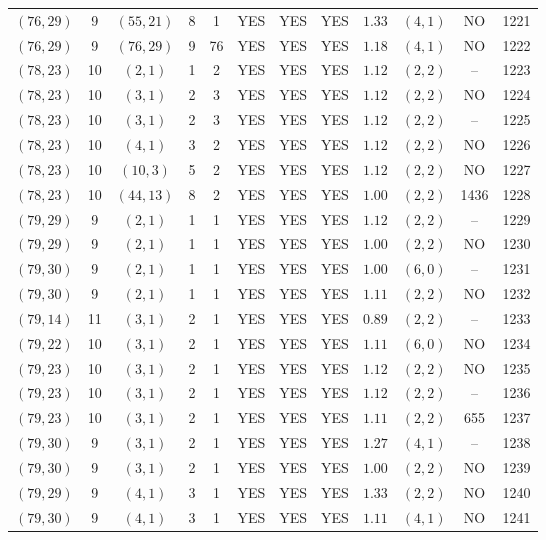 \begin{longtable}{|c|c|c|c|c|c|c|c|c|c|c|c|}
$(76,29)$ & 9 & $(55,21)$ & 8 & 1 & YES & YES & YES & $1.33$ & $(4,1)$ & NO & 1221\\
$(76,29)$ & 9 & $(76,29)$ & 9 & 76 & YES & YES & YES & $1.18$ & $(4,1)$ & NO & 1222\\
$(78,23)$ & 10 & $(2,1)$ & 1 & 2 & YES & YES & YES & $1.12$ & $(2,2)$ & -- & 1223\\
$(78,23)$ & 10 & $(3,1)$ & 2 & 3 & YES & YES & YES & $1.12$ & $(2,2)$ & NO & 1224\\
$(78,23)$ & 10 & $(3,1)$ & 2 & 3 & YES & YES & YES & $1.12$ & $(2,2)$ & -- & 1225\\
$(78,23)$ & 10 & $(4,1)$ & 3 & 2 & YES & YES & YES & $1.12$ & $(2,2)$ & NO & 1226\\
$(78,23)$ & 10 & $(10,3)$ & 5 & 2 & YES & YES & YES & $1.12$ & $(2,2)$ & NO & 1227\\
$(78,23)$ & 10 & $(44,13)$ & 8 & 2 & YES & YES & YES & $1.00$ & $(2,2)$ & 1436 & 1228\\
$(79,29)$ & 9 & $(2,1)$ & 1 & 1 & YES & YES & YES & $1.12$ & $(2,2)$ & -- & 1229\\
$(79,29)$ & 9 & $(2,1)$ & 1 & 1 & YES & YES & YES & $1.00$ & $(2,2)$ & NO & 1230\\
$(79,30)$ & 9 & $(2,1)$ & 1 & 1 & YES & YES & YES & $1.00$ & $(6,0)$ & -- & 1231\\
$(79,30)$ & 9 & $(2,1)$ & 1 & 1 & YES & YES & YES & $1.11$ & $(2,2)$ & NO & 1232\\
$(79,14)$ & 11 & $(3,1)$ & 2 & 1 & YES & YES & YES & $0.89$ & $(2,2)$ & -- & 1233\\
$(79,22)$ & 10 & $(3,1)$ & 2 & 1 & YES & YES & YES & $1.11$ & $(6,0)$ & NO & 1234\\
$(79,23)$ & 10 & $(3,1)$ & 2 & 1 & YES & YES & YES & $1.12$ & $(2,2)$ & NO & 1235\\
$(79,23)$ & 10 & $(3,1)$ & 2 & 1 & YES & YES & YES & $1.12$ & $(2,2)$ & -- & 1236\\
$(79,23)$ & 10 & $(3,1)$ & 2 & 1 & YES & YES & YES & $1.11$ & $(2,2)$ & 655 & 1237\\
$(79,30)$ & 9 & $(3,1)$ & 2 & 1 & YES & YES & YES & $1.27$ & $(4,1)$ & -- & 1238\\
$(79,30)$ & 9 & $(3,1)$ & 2 & 1 & YES & YES & YES & $1.00$ & $(2,2)$ & NO & 1239\\
$(79,29)$ & 9 & $(4,1)$ & 3 & 1 & YES & YES & YES & $1.33$ & $(2,2)$ & NO & 1240\\
$(79,30)$ & 9 & $(4,1)$ & 3 & 1 & YES & YES & YES & $1.11$ & $(4,1)$ & NO & 1241\\

\end{longtable}
